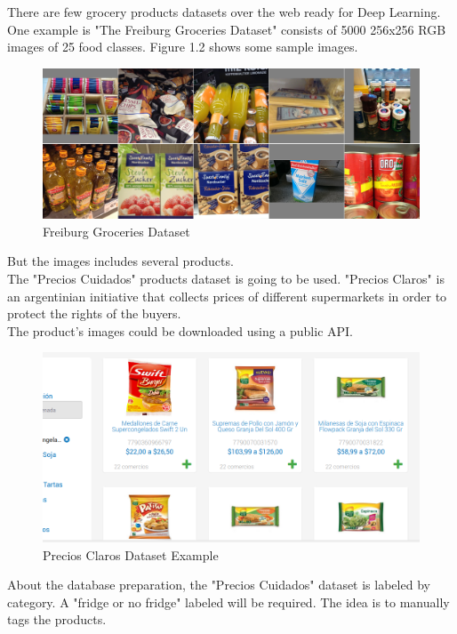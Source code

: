 \documentclass[a4paper,10pt]{article}
\begin{document}
There are few grocery products datasets over the web ready for Deep Learning. One example is "The Freiburg Groceries Dataset" consists of 5000 256x256 RGB images of 25 food classes. Figure 1.2 shows some sample images. \\

\begin{figure}
  \includegraphics[width=\linewidth]{examples.png}
  \caption{Freiburg Groceries Dataset}
  \label{fig:boat1}
\end{figure}


But the images includes several products. \\

The "Precios Cuidados" products dataset is going to be used. "Precios Claros" is an argentinian initiative that collects prices of different supermarkets in order to protect the rights of the buyers. \\

The product's images could be downloaded using a public API. \\

\begin{figure}
  \includegraphics[width=\linewidth]{products.png}
  \caption{Precios Claros Dataset Example}
  \label{fig:boat1}
\end{figure}

About the database preparation, the "Precios Cuidados" dataset is labeled by category. A "fridge or no fridge" labeled will be required. The idea is to manually tags the products. \\ 
\end{document}
